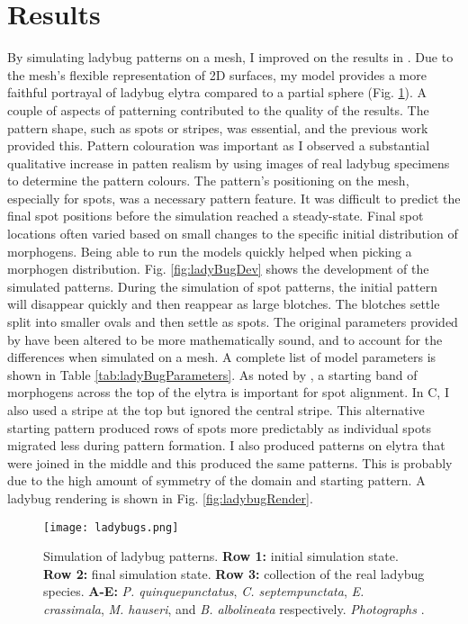 \section{Results}
By simulating ladybug patterns on a mesh, I improved on the results in \citep{liaw2001}. Due to the mesh's flexible representation of 2D surfaces, my model provides a more faithful portrayal of ladybug elytra compared to a partial sphere (Fig. \ref{fig:ladyBugPatterns}). A couple of aspects of patterning contributed to the quality of the results. The pattern shape, such as spots or stripes, was essential, and the previous work provided this. Pattern colouration was important as I observed a substantial qualitative increase in patten realism by using images of real ladybug specimens to determine the pattern colours. The pattern's positioning on the mesh, especially for spots, was a necessary pattern feature. It was difficult to predict the final spot positions before the simulation reached a steady-state. Final spot locations often varied based on small changes to the specific initial distribution of morphogens. Being able to run the models quickly helped when picking a morphogen distribution. Fig. \ref{fig:ladyBugDev} shows the development of the simulated patterns. During the simulation of spot patterns, the initial pattern will disappear quickly and then reappear as large blotches. The blotches settle split into smaller ovals and then settle as spots. The original parameters provided by \citet{liaw2001} have been altered to be more mathematically sound, and to account for the differences when simulated on a mesh. A complete list of model parameters is shown in Table \ref{tab:ladyBugParameters}. As noted by \citet{liaw2001}, a starting band of morphogens across the top of the elytra is important for spot alignment. In C, I also used a stripe at the top but ignored the central stripe. This alternative starting pattern produced rows of spots more predictably as individual spots migrated less during pattern formation. I also produced patterns on elytra that were joined in the middle and this produced the same patterns. This is probably due to the high amount of symmetry of the domain and starting pattern. A ladybug rendering is shown in Fig. \ref{fig:ladybugRender}.

\begin{figure}[ht]
	\centering
	\texttt{[image: ladybugs.png]}
	\caption[Simulation of ladybug patterns]{Simulation of ladybug patterns. \textbf{Row 1:} initial simulation state. \textbf{Row 2:} final simulation state. \textbf{Row 3:} collection of the real ladybug species. \textbf{A-E:} \textit{P. quinquepunctatus}, \textit{C. septempunctata}, \textit{E. crassimala}, \textit{M. hauseri}, and \textit{B. albolineata} respectively. \textit{Photographs} .}
	\label{fig:ladyBugPatterns}
\end{figure}


